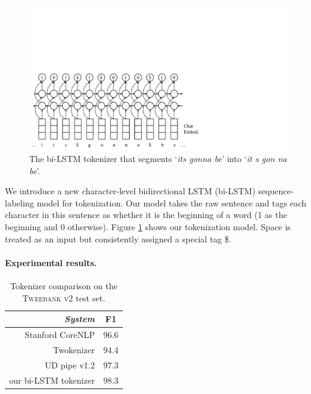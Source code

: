 \documentclass[11pt,a4paper]{article}
\begin{document}
\begin{figure}[t]
	\centering
	\includegraphics[width=\columnwidth,trim={0 0 11cm 9cm},clip]{graphics/bilstm_tokenizer}
	\caption{The bi-LSTM tokenizer that segments `{\it its gonna be}' into `{\it it s gon na be}'.}\label{fig:tok-model}
\end{figure}
We introduce a new
character-level bidirectional LSTM (bi-LSTM) sequence-labeling model
\cite{DBLP:journals/corr/HuangXY15,ma-hovy:2016:P16-1}
for tokenization.
Our model takes the raw sentence and tags each character in this 
sentence as whether it is the beginning of a word (1 as the beginning and 0 otherwise).
Figure \ref{fig:tok-model} shows our tokenization model.
Space is treated as an input but consistently assigned a special tag \$.

\paragraph{Experimental results.}

\begin{table}[t]
	\centering
	\begin{tabular}{rc}
		\hline
		\it System & F1 \\
		\hline
		  Stanford CoreNLP & 96.6 \\
		 Twokenizer & 94.4 \\		 
		\hdashline
		UD pipe v1.2 & 97.3 \\
	 	our bi-LSTM tokenizer & 98.3 \\
		\hline
	\end{tabular}
	\caption{Tokenizer comparison on the \textsc{Tweebank v2} test set.}\label{tbl:tok-result}
\end{table}
\end{document}
